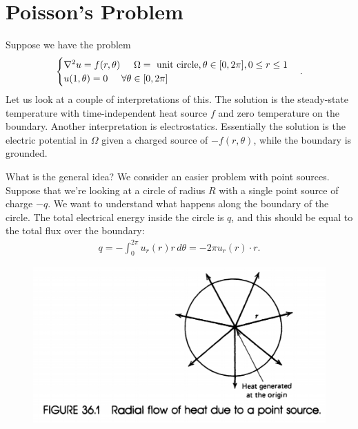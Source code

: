 \documentclass{book}
\theoremstyle{definition}
\begin{document}
\chapter{Poisson's Problem}
Suppose we have the problem
\begin{align*}
\begin{cases}
\laplacian u  = f(r,\theta) \hspace{0.5cm} \Omega = \text{ unit circle}, \theta\in [0,2\pi], 0\leq r \leq 1\\
u(1,\theta) = 0 \hspace{0.5cm}\forall \theta \in [0,2\pi]
\end{cases}.
\end{align*}
Let us look at a couple of interpretations of this. The solution is the steady-state temperature with time-independent heat source $f$ and zero temperature on the boundary. Another interpretation is electrostatics. Essentially the solution is the electric potential in $\Omega$ given a charged source of $-f(r,\theta)$, while the boundary is grounded. 

What is the general idea? We consider an easier problem with point sources. Suppose that we're looking at a circle of radius $R$ with a single point source of charge $-q$. We want to understand what happens along the boundary of the circle. The total electrical energy inside the circle is $q$, and this should be equal to the total flux over the boundary:
\begin{align*}
q = -\int^{2\pi}_0 u_r(r)r\,d\theta = -2\pi u_r(r)\cdot r.
\end{align*}

\begin{figure}[h!]
	\centering
	\includegraphics[scale=0.5]{charge3.png}
\end{figure}
\end{document}
